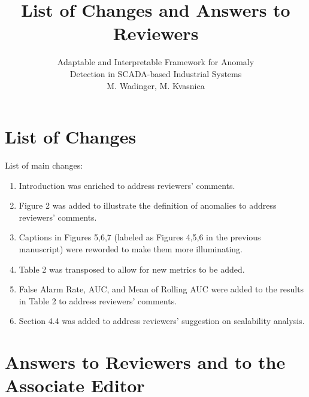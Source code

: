 \documentclass{article}
\title{List of Changes and Answers to Reviewers}
\author{Adaptable and Interpretable Framework for Anomaly\\Detection in SCADA-based Industrial Systems
  \\M. Wadinger, M. Kvasnica}
\begin{document}
\maketitle


\section{List of Changes}

List of main changes:
\begin{enumerate}

  \item Introduction was enriched to address reviewers' comments.
  \item Figure 2 was added to illustrate the definition of anomalies to address reviewers' comments.
  \item Captions in Figures 5,6,7 (labeled as Figures 4,5,6 in the previous manuscript) were reworded to make them more illuminating.
  \item Table 2 was transposed to allow for new metrics to be added.
  \item False Alarm Rate, AUC, and Mean of Rolling AUC were added to the results in Table 2 to address reviewers' comments.
  \item Section 4.4 was added to address reviewers' suggestion on scalability analysis.
\end{enumerate}

\section{Answers to Reviewers and to the Associate Editor}
\end{document}
